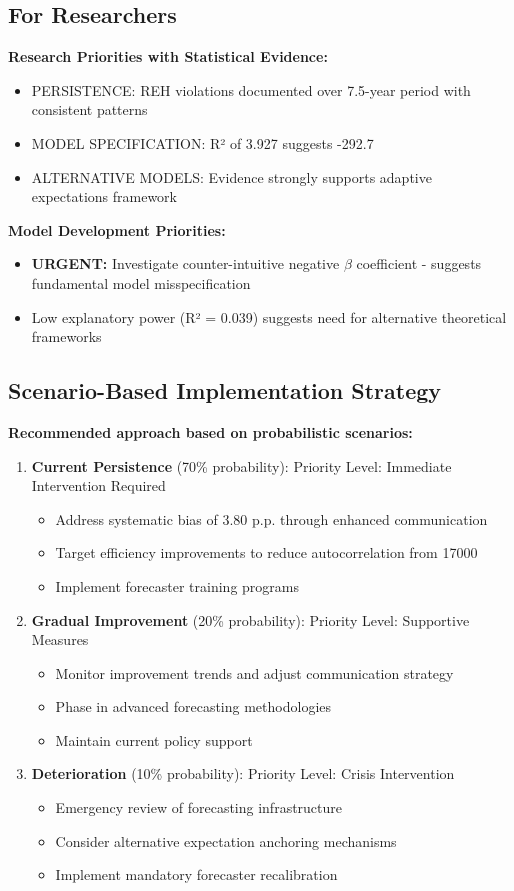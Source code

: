 \documentclass[11pt,a4paper]{article}
\begin{document}
\subsection{For Researchers}
\textbf{Research Priorities with Statistical Evidence:}

\begin{itemize}
\item PERSISTENCE: REH violations documented over 7.5-year period with consistent patterns
\item MODEL SPECIFICATION: R² of 3.927 suggests -292.7%
\item ALTERNATIVE MODELS: Evidence strongly supports adaptive expectations framework
\end{itemize}

\textbf{Model Development Priorities:}
\begin{itemize}
\item \textbf{URGENT:} Investigate counter-intuitive negative $\beta$ coefficient - suggests fundamental model misspecification
\item Low explanatory power (R² = 0.039) suggests need for alternative theoretical frameworks
\end{itemize}

\subsection{Scenario-Based Implementation Strategy}
\textbf{Recommended approach based on probabilistic scenarios:}

\begin{enumerate}
\item \textbf{Current Persistence} (70\% probability):
Priority Level: Immediate Intervention Required
\begin{itemize}
\item Address systematic bias of 3.80 p.p. through enhanced communication
\item Target efficiency improvements to reduce autocorrelation from 17000
\item Implement forecaster training programs
\end{itemize}
\item \textbf{Gradual Improvement} (20\% probability):
Priority Level: Supportive Measures
\begin{itemize}
\item Monitor improvement trends and adjust communication strategy
\item Phase in advanced forecasting methodologies
\item Maintain current policy support
\end{itemize}
\item \textbf{Deterioration} (10\% probability):
Priority Level: Crisis Intervention
\begin{itemize}
\item Emergency review of forecasting infrastructure
\item Consider alternative expectation anchoring mechanisms
\item Implement mandatory forecaster recalibration
\end{itemize}
\end{enumerate}
\end{document}
